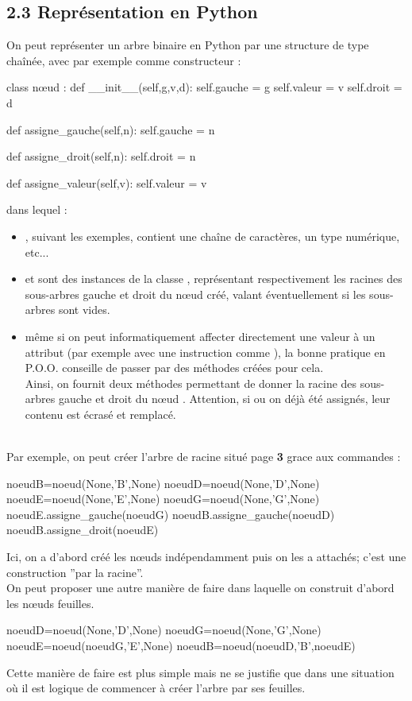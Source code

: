 \documentclass[11pt,a4paper,french,twoside]{PMCours}
\begin{document}
\subsection*{2.3 Représentation en Python}
On peut représenter un arbre binaire en Python par une structure de type chaînée, avec par exemple comme constructeur :
\begin{Python}
class nœud : 
	def __init__(self,g,v,d):
		self.gauche = g
		self.valeur = v
		self.droit = d

	def assigne_gauche(self,n):
		self.gauche = n

	def assigne_droit(self,n):
		self.droit = n
		
	def assigne_valeur(self,v):
		self.valeur = v	
\end{Python}
dans lequel :
\begin{itemize}
\item {}, suivant les exemples, contient une chaîne de caractères, un type numérique, etc...
\item {} et  sont des instances de la classe , représentant respectivement les racines des sous-arbres gauche et droit du nœud créé, valant éventuellement  si les sous-arbres sont vides. 
\item même si on peut informatiquement affecter directement une valeur à un attribut (par exemple avec une instruction comme ), la bonne pratique en P.O.O. conseille de passer par des méthodes créées pour cela.\\
Ainsi, on fournit deux méthodes permettant de donner la racine des sous-arbres gauche et droit du nœud . Attention, si  ou  on déjà été assignés, leur contenu est écrasé et remplacé.
\end{itemize}\ \\
Par exemple, on peut créer l'arbre de racine  situé page {\bf 3} grace aux commandes : 
\begin{Python}
noeudB=noeud(None,'B',None)
noeudD=noeud(None,'D',None)
noeudE=noeud(None,'E',None)
noeudG=noeud(None,'G',None)
noeudE.assigne_gauche(noeudG)
noeudB.assigne_gauche(noeudD)
noeudB.assigne_droit(noeudE)
\end{Python}
Ici, on a d'abord créé les nœuds indépendamment puis on les a attachés; c'est une construction ''par la racine''. \\
On peut proposer une autre manière de faire dans laquelle on construit d'abord les nœuds feuilles.
\begin{Python}
noeudD=noeud(None,'D',None)
noeudG=noeud(None,'G',None)
noeudE=noeud(noeudG,'E',None)
noeudB=noeud(noeudD,'B',noeudE)
\end{Python}
Cette manière de faire est plus simple mais ne se justifie que dans une situation où il est logique de commencer à créer l'arbre par ses feuilles. 
\end{document}
